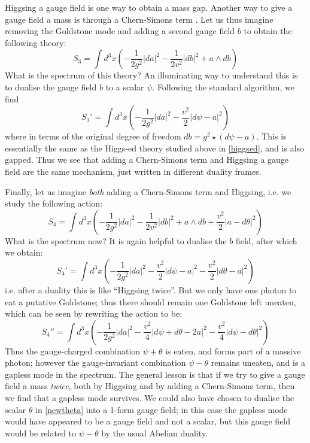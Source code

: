 \documentclass[aps,preprint,nofootinbib,preprintnumbers,eqsecnum,superscriptaddress]{revtex4}
\def\th{{\theta}}
\def\le{\left}
\def\ri{\right}
\begin{document}
Higgsing a gauge field is one way to obtain a mass gap. Another way to give a gauge field a mass is through a Chern-Simons term \cite{Deser:1981wh}. Let us thus imagine removing the Goldstone mode and adding a second gauge field $b$ to obtain the following theory:
\begin{equation}
S_{3} = \int d^3x \le(-\frac{1}{2 g^2} \left|da\right|^2 -\frac{1}{2 v^2}\left|db\right|^2 +  a \wedge db\ri)
\end{equation}
What is the spectrum of this theory? An illuminating way to understand this is to dualise the gauge field $b$ to a scalar $\psi$. Following the standard algorithm, we find
\begin{equation}
S_{3}' = \int d^3x \le(-\frac{1}{2 g^2}\left|da\right|^2 - \frac{v^2}{2} \left|d\psi - a\right|^2 \ri) 
\end{equation}
where in terms of the original degree of freedom $db = g^2 \star(d\psi - a)$. This is essentially the same as the Higgs-ed theory studied above in \eqref{higgsed}, and is also gapped. Thus we see that adding a Chern-Simons term and Higgsing a gauge field are the same mechanism, just written in different duality frames.  

Finally, let us imagine {\it both} adding a Chern-Simons term and Higgsing, i.e. we study the following action:
\begin{equation}
S_{4} = \int d^3x \le(-\frac{1}{2 g^2} |da|^2 - \frac{1}{2 v^2} |db|^2 +  a \wedge db + \frac{v^2}{2} |a-d\theta|^2 \ri) \label{newtheta}
\end{equation}
What is the spectrum now? It is again helpful to dualise the $b$ field, after which we obtain:
\begin{equation}
S_{4}' = \int d^3x \le(-\frac{1}{2 g^2}|da|^2 - \frac{v^2}{2} |d\psi -  a|^2 - \frac{v^2}{2} |d\theta - a|^2 \ri) 
\end{equation} 
i.e. after a duality this is like ``Higgsing twice''. But we only have one photon to eat a putative Goldstone; thus there should remain one Goldstone left uneaten, which can be seen by rewriting the action to be:
\begin{equation}
S_{4}'' = \int d^3x \le(-\frac{1}{2g^2}|da|^2 - \frac{v^2}{4}|d\psi + d\th - 2 a|^2 - \frac{v^2}{4}|d\psi-d\th|^2\ri)
\end{equation}
Thus the gauge-charged combination $\psi + \th$ is eaten, and forms part of a massive photon; however the gauge-invariant combination $\psi - \th$ remains uneaten, and is a gapless mode in the spectrum. The general lesson is that if we try to give a gauge field a mass {\it twice}, both by Higgsing and by adding a Chern-Simons term, then we find that a gapless mode survives. We could also have chosen to dualise the scalar $\th$ in \eqref{newtheta} into a 1-form gauge field; in this case the gapless mode would have appeared to be a gauge field and not a scalar, but this gauge field would be related to $\psi - \th$ by the usual Abelian duality. 
\end{document}
